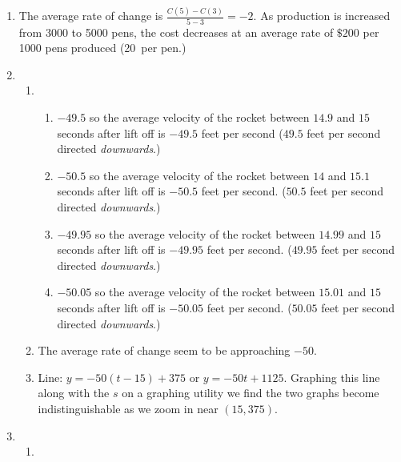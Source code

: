 \documentclass{ximera}
\begin{document}
\begin{enumerate}
\item The average rate of change is $\frac{C(5)-C(3)}{5-3}=-2$.  As production is increased from 3000 to 5000 pens, the cost decreases at an average rate of  $\$200$ per 1000 pens produced (20\textcent \, per pen.)


\item

\begin{enumerate}

\item

\begin{enumerate}

\item  $-49.5$ so the average velocity of the rocket between $14.9$ and $15$ seconds after lift off is $-49.5$ feet per second ($49.5$ feet per second directed \textit{downwards}.)

\item  $-50.5$ so the average velocity of the rocket between $14$ and $15.1$ seconds after lift off is $-50.5$ feet per second. ($50.5$ feet per second directed \textit{downwards}.)

\item  $-49.95$ so the average velocity of the rocket between $14.99$ and $15$ seconds after lift off is $-49.95$ feet per second. ($49.95$ feet per second directed \textit{downwards}.)

\item   $-50.05$ so the average velocity of the rocket between $15.01$ and $15$ seconds after lift off is $-50.05$ feet per second. ($50.05$ feet per second directed \textit{downwards}.)
\end{enumerate}


\item  The average rate of change seem to be approaching $-50$.

\item  Line:  $y = -50(t-15) + 375$ or $y =   -50t + 1125$.  Graphing this line along with the $s$ on a graphing utility we find the two graphs become indistinguishable as we zoom in near $(15, 375)$.

\end{enumerate}

\enlargethispage{0.5in}

\addtocounter{enumi}{3}

\item \begin{enumerate}

 \item


\end{enumerate}
\end{enumerate}
\end{document}
